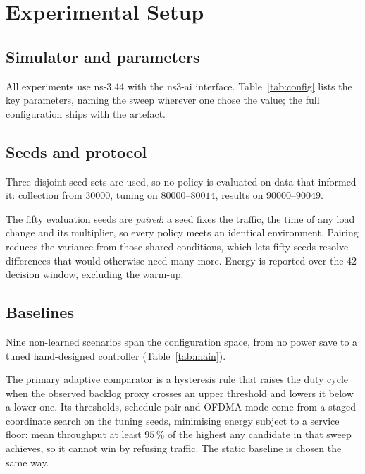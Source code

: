 \section{Experimental Setup}
\label{sec:setup}

\subsection{Simulator and parameters}

All experiments use ns-3.44 with the ns3-ai interface. Table~\ref{tab:config}
lists the key parameters, naming the sweep wherever one chose the value; the
full configuration ships with the artefact.



\subsection{Seeds and protocol}

Three disjoint seed sets are used, so no policy is evaluated on data that
informed it: collection from $30000$, tuning on $80000$--$80014$, results on
$90000$--$90049$.

The fifty evaluation seeds are \emph{paired}: a seed fixes the traffic, the
time of any load change and its multiplier, so every policy meets an identical
environment. Pairing reduces the variance from those shared conditions, which
lets fifty seeds resolve differences that would otherwise need many more.
Energy is reported over the $42$-decision window, excluding the warm-up.

\subsection{Baselines}

Nine non-learned scenarios span the configuration space, from no power save to
a tuned hand-designed controller (Table~\ref{tab:main}).

The primary adaptive comparator is a hysteresis rule that raises the duty cycle
when the observed backlog proxy crosses an upper threshold and lowers it below a
lower one. Its thresholds, schedule pair and OFDMA mode come from a staged
coordinate search on the tuning seeds, minimising energy subject to a service
floor: mean throughput at least $95\,\%$ of the highest any candidate in that
sweep achieves, so it cannot win by refusing traffic. The static baseline is chosen the same way.
